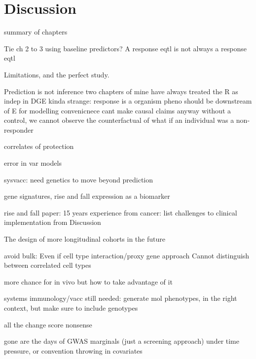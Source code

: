 %
%

\chapter{Discussion}

\begin{outline}

summary of chapters

    Tie ch 2 to 3 using baseline predictors?
    A response eqtl is not always a response eqtl

    Limitations, and the perfect study.

Prediction is not inference
    two chapters of mine
    have always treated the R as indep in DGE
    kinda strange: response is a organism pheno should be downstream of E
        for modelling convenicnece
        cant make causal claims anyway
            without a control, we cannot observe the counterfactual of what if an individual was a non-responder

        correlates of protection

        error in var models


    sysvacc: need genetics to move beyond prediction

    gene signatures, rise and fall
        expression as a biomarker

        rise and fall paper: 15 years experience from cancer: list challenges to clinical implementation from Discussion

The design of more longitudinal cohorts in the future

    avoid bulk:
        Even if cell type interaction/proxy gene approach
        Cannot distinguish between correlated cell types

    more chance for in vivo
        but how to take advantage of it

    systems immunology/vacc still needed: generate mol phenotypes, in the right context,
    but make sure to include genotypes

    all the change score nonsense

    gone are the days of GWAS marginals (just a screening approach)
        under time pressure, or convention
        throwing in covariates


\end{outline}
